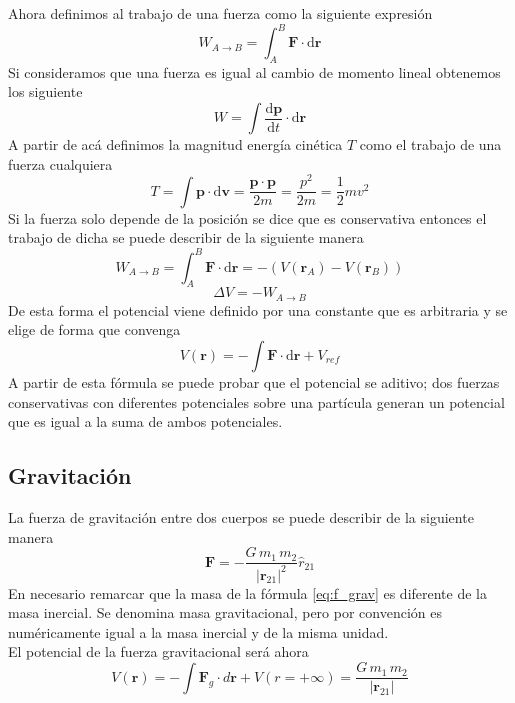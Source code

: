\documentclass[a4paper]{article}
\numberwithin{equation}{section}
\begin{document}
	Ahora definimos al trabajo de una fuerza como la siguiente expresión
	\begin{equation}
		W_{A \to B} = \int_{A}^B \boldsymbol{F} \cdot \mathrm{d}\boldsymbol{r} \label{eq:trabajo}
	\end{equation}
	Si consideramos que una fuerza es igual al cambio de momento lineal obtenemos los siguiente
	\begin{equation*}
		W = \int \frac{\mathrm{d}\boldsymbol{p}}{\mathrm{d}t} \cdot \mathrm{d}\boldsymbol{r}
	\end{equation*}
	A partir de acá definimos la magnitud energía cinética $T$ como el trabajo de una fuerza cualquiera
	\begin{equation}
		T = \int \boldsymbol{p} \cdot \mathrm{d}\boldsymbol{v} = \frac{\boldsymbol{p}\cdot\boldsymbol{p}}{2m} = \frac{p^2}{2m} = \frac{1}{2}m v^2
	\end{equation}
	Si la fuerza solo depende de la posición se dice que es conservativa entonces el trabajo de dicha se puede describir de la siguiente manera
	\begin{equation*}
		W_{A \to B} = \int_{A}^B \boldsymbol{F} \cdot \mathrm{d}\boldsymbol{r} = - (V(\boldsymbol{r}_A) - V(\boldsymbol{r}_B))
	\end{equation*}
	\begin{equation*}
		\Delta V = - W_{A \to B}
	\end{equation*}
	De esta forma el potencial viene definido por una constante que es arbitraria y se elige de forma que convenga
	\begin{equation}
		V(\boldsymbol{r}) = - \int \boldsymbol{F} \cdot \mathrm{d}\boldsymbol{r} + V_{ref} \label{eq:potencial}
	\end{equation}
	A partir de esta fórmula se puede probar que el potencial se aditivo; dos fuerzas conservativas con diferentes potenciales sobre una partícula generan un potencial que es igual a la suma de ambos potenciales.			
	\subsection{Gravitación}
	La fuerza de gravitación entre dos cuerpos se puede describir de la siguiente manera
	\begin{equation}
		\boldsymbol{F} = - \frac{G\,m_1\,m_2}{|\boldsymbol{r}_{21}|^2} \hat{r}_{21} \label{eq:f_grav}
	\end{equation}
	En necesario remarcar que la masa de la fórmula \ref{eq:f_grav} es diferente de la masa inercial. Se denomina masa gravitacional, pero por convención es numéricamente igual a la masa inercial y de la misma unidad.\\
	El potencial de la fuerza gravitacional será ahora
	\begin{equation}
		V(\boldsymbol{r}) = - \int \boldsymbol{F}_{g} \cdot d\boldsymbol{r} + V(r = + \infty) = \frac{G\,m_1\,m_2}{|\boldsymbol{r}_{21}|}
	\end{equation}
\end{document}
